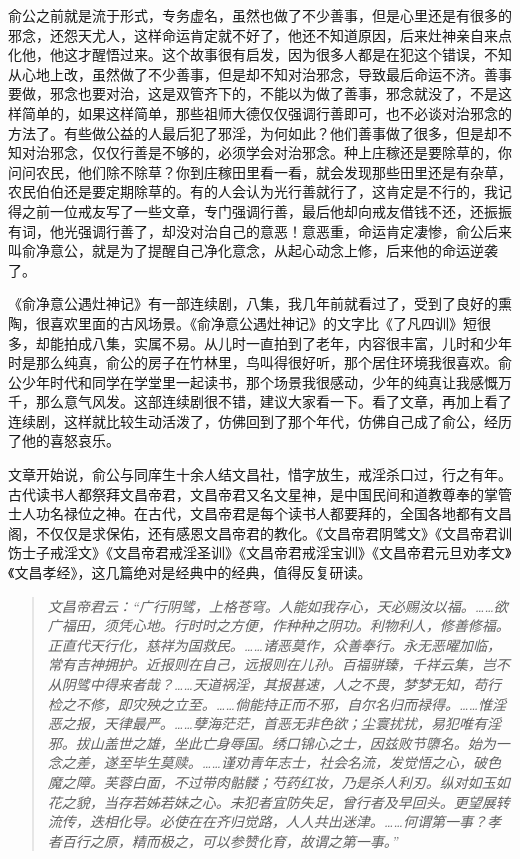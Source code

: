 俞公之前就是流于形式，专务虚名，虽然也做了不少善事，但是心里还是有很多的邪念，还怨天尤人，这样命运肯定就不好了，他还不知道原因，后来灶神亲自来点化他，他这才醒悟过来。这个故事很有启发，因为很多人都是在犯这个错误，不知从心地上改，虽然做了不少善事，但是却不知对治邪念，导致最后命运不济。善事要做，邪念也要对治，这是双管齐下的，不能以为做了善事，邪念就没了，不是这样简单的，如果这样简单，那些祖师大德仅仅强调行善即可，也不必谈对治邪念的方法了。有些做公益的人最后犯了邪淫，为何如此？他们善事做了很多，但是却不知对治邪念，仅仅行善是不够的，必须学会对治邪念。种上庄稼还是要除草的，你问问农民，他们除不除草？你到庄稼田里看一看，就会发现那些田里还是有杂草，农民伯伯还是要定期除草的。有的人会认为光行善就行了，这肯定是不行的，我记得之前一位戒友写了一些文章，专门强调行善，最后他却向戒友借钱不还，还振振有词，他光强调行善了，却没对治自己的意恶！意恶重，命运肯定凄惨，俞公后来叫俞净意公，就是为了提醒自己净化意念，从起心动念上修，后来他的命运逆袭了。

《俞净意公遇灶神记》有一部连续剧，八集，我几年前就看过了，受到了良好的熏陶，很喜欢里面的古风场景。《俞净意公遇灶神记》的文字比《了凡四训》短很多，却能拍成八集，实属不易。从儿时一直拍到了老年，内容很丰富，儿时和少年时是那么纯真，俞公的房子在竹林里，鸟叫得很好听，那个居住环境我很喜欢。俞公少年时代和同学在学堂里一起读书，那个场景我很感动，少年的纯真让我感慨万千，那么意气风发。这部连续剧很不错，建议大家看一下。看了文章，再加上看了连续剧，这样就比较生动活泼了，仿佛回到了那个年代，仿佛自己成了俞公，经历了他的喜怒哀乐。

文章开始说，俞公与同庠生十余人结文昌社，惜字放生，戒淫杀口过，行之有年。古代读书人都祭拜文昌帝君，文昌帝君又名文星神，是中国民间和道教尊奉的掌管士人功名禄位之神。在古代，文昌帝君是每个读书人都要拜的，全国各地都有文昌阁，不仅仅是求保佑，还有感恩文昌帝君的教化。《文昌帝君阴骘文》《文昌帝君训饬士子戒淫文》《文昌帝君戒淫圣训》《文昌帝君戒淫宝训》《文昌帝君元旦劝孝文》《文昌孝经》，这几篇绝对是经典中的经典，值得反复研读。

\begin{quote}\it
    文昌帝君云：“广行阴骘，上格苍穹。人能如我存心，天必赐汝以福。……欲广福田，须凭心地。行时时之方便，作种种之阴功。利物利人，修善修福。正直代天行化，慈祥为国救民。……诸恶莫作，众善奉行。永无恶曜加临，常有吉神拥护。近报则在自己，远报则在儿孙。百福骈臻，千祥云集，岂不从阴骘中得来者哉？……天道祸淫，其报甚速，人之不畏，梦梦无知，苟行检之不修，即灾殃之立至。……倘能持正而不邪，自尔名归而禄得。……惟淫恶之报，天律最严。……孽海茫茫，首恶无非色欲；尘寰扰扰，易犯唯有淫邪。拔山盖世之雄，坐此亡身辱国。绣口锦心之士，因兹败节隳名。始为一念之差，遂至毕生莫赎。……谨劝青年志士，社会名流，发觉悟之心，破色魔之障。芙蓉白面，不过带肉骷髅；芍药红妆，乃是杀人利刃。纵对如玉如花之貌，当存若姊若妹之心。未犯者宜防失足，曾行者及早回头。更望展转流传，迭相化导。必使在在齐归觉路，人人共出迷津。……何谓第一事？孝者百行之原，精而极之，可以参赞化育，故谓之第一事。”
\end{quote}

